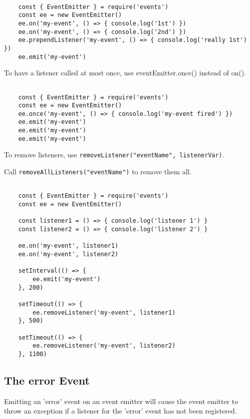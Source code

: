 \documentclass{scrartcl}
\begin{document}
\begin{lstlisting}[style=ES6]

    const { EventEmitter } = require('events')
    const ee = new EventEmitter()
    ee.on('my-event', () => { console.log('1st') })
    ee.on('my-event', () => { console.log('2nd') })
    ee.prependListener('my-event', () => { console.log('really 1st') })
    ee.emit('my-event')

\end{lstlisting}

To have a listener called at most once, use eventEmitter.once() instead of on().

\begin{lstlisting}[style=ES6]

    const { EventEmitter } = require('events')
    const ee = new EventEmitter()
    ee.once('my-event', () => { console.log('my-event fired') })
    ee.emit('my-event')
    ee.emit('my-event')
    ee.emit('my-event')

\end{lstlisting}

To remove listeners, use \lstinline|removeListener("eventName", listenerVar)|.

Call \lstinline|removeAllListeners("eventName")| to remove them all.

\begin{lstlisting}[style=ES6]

    const { EventEmitter } = require('events')
    const ee = new EventEmitter()

    const listener1 = () => { console.log('listener 1') }
    const listener2 = () => { console.log('listener 2') }

    ee.on('my-event', listener1)
    ee.on('my-event', listener2)

    setInterval(() => {
        ee.emit('my-event')
    }, 200)

    setTimeout(() => {
        ee.removeListener('my-event', listener1)
    }, 500)

    setTimeout(() => {
        ee.removeListener('my-event', listener2)
    }, 1100)

\end{lstlisting}

\subsection{The error Event}

Emitting an 'error' event on an event emitter will cause the event emitter to throw an exception if a listener for the 'error' event has not been registered.
\end{document}
